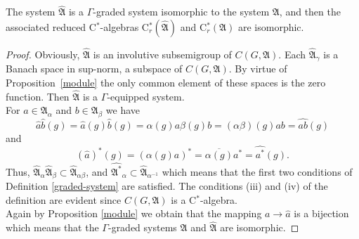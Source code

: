 \documentclass[
11pt,%
tightenlines,%
twoside,%
onecolumn,%
nofloats,%
nobibnotes,%
nofootinbib,%
superscriptaddress,%
noshowpacs,%
centertags]%
{revtex4}
\begin{document}
\begin{theorem}
    The system $\widehat{\mathfrak{A}}$ is a $\Gamma$-graded system isomorphic to the system $\mathfrak{A}$, and then the associated reduced C$^*$-algebras C$^*_r(\widehat{\mathfrak{A}})$ and C$^*_r(\mathfrak{A})$
are isomorphic.
\end{theorem}
\begin{proof}
    Obviously, $\widehat{\mathfrak{A}}$ is an involutive subsemigroup of $C(G, \mathfrak  A)$. Each $\widehat{\mathfrak{A}}_\gamma$ is a Banach space in sup-norm, a subspace of $C(G, \mathfrak A)$. By virtue of  Proposition~\ref{module} the only common element of these spaces is the zero function. Then  $\widehat{\mathfrak{A}}$ is a  $\Gamma$-equipped system.\\
    For $a\in\mathfrak A_\alpha$ and $b\in\mathfrak A_\beta$    we have
$$\hat a\hat b(g)=\hat a(g)\hat b(g) =\alpha(g)a\beta(g)b=(\alpha\beta)(g)ab = \widehat{ab}(g)$$
and
$$
    (\hat a)^*(g) = (\alpha(g)a)^* = \overline{\alpha(g)}a^* = \widehat{a^*}(g).
    $$
    Thus, $\widehat{\mathfrak  A}_\alpha\widehat{\mathfrak  A}_\beta\subset \widehat{\mathfrak  A}_{\alpha\beta}$, and  $\widehat{\mathfrak A^*}_\alpha\subset \widehat{\mathfrak A}_{\alpha^{-1}}$     which means that the first two conditions of Definition \ref{graded-system} are satisfied. The conditions (iii) and (iv) of the definition are evident since $C(G, \mathfrak A)$ is a  C$^*$-algebra.\\   Again by Proposition \ref{module}  we obtain that the mapping  $a\rightarrow \hat a$  is a bijection  which means
    that the $\Gamma$-graded systems $\mathfrak A$ and $\widehat{\mathfrak{A}}$  are isomorphic.
\end{proof}
\end{document}
